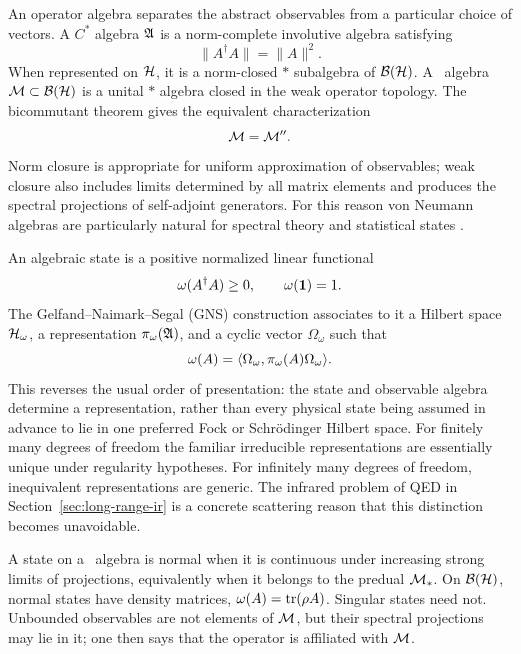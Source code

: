 An operator algebra separates the abstract observables from a particular
choice of vectors.  A $C^*$ algebra $\mathfrak{A}$ is a norm-complete involutive
algebra satisfying
\begin{equation}
  \|A^\dagger A\|=\|A\|^2 .
  \label{eq:cstar-identity}
\end{equation}
When represented on $\mathcal{H}$, it is a norm-closed $*$ subalgebra of
$\mathcal{B}(\mathcal{H})$.  A \vN\ algebra $\mathcal{M}\subset\mathcal{B}(\mathcal{H})$ is a unital
$*$ algebra closed in the weak operator topology.  The bicommutant theorem
gives the equivalent characterization
\begin{equation}
  \mathcal{M}=\mathcal{M}'' .
  \label{eq:bicommutant-theorem}
\end{equation}
Norm closure is appropriate for uniform approximation of observables; weak
closure also includes limits determined by all matrix elements and produces
the spectral projections of self-adjoint generators.  For this reason von
Neumann algebras are particularly natural for spectral theory and statistical
states \cite{Takesaki:2002,BratteliRobinsonI:1987}.

An algebraic state is a positive normalized linear functional
\begin{equation}
  \omega(A^\dagger A)\geq0,
  \qquad
  \omega(\mathbf{1})=1 .
  \label{eq:algebraic-state}
\end{equation}
The Gelfand--Naimark--Segal (GNS) construction associates to it a Hilbert space
$\mathcal{H}_\omega$, a representation $\pi_\omega(\mathfrak{A})$, and a cyclic
vector $\Omega_\omega$ such that
\begin{equation}
  \omega(A)
  =\langle \Omega_\omega,\pi_\omega(A)\Omega_\omega\rangle .
  \label{eq:GNS-state}
\end{equation}
This reverses the usual order of presentation: the state and observable
algebra determine a representation, rather than every physical state being
assumed in advance to lie in one preferred Fock or Schr\"odinger Hilbert space.
For finitely many degrees of freedom the familiar irreducible representations
are essentially unique under regularity hypotheses.  For infinitely many
degrees of freedom, inequivalent representations are generic.  The infrared
problem of QED in Section~\ref{sec:long-range-ir} is a concrete scattering
reason that this distinction becomes unavoidable.

A state on a \vN\ algebra is normal when it is continuous under
increasing strong limits of projections, equivalently when it belongs to the
predual $\mathcal{M}_*$.  On $\mathcal{B}(\mathcal{H})$, normal states have density matrices,
$\omega(A)=\operatorname{tr}(\rho A)$.  Singular states need not.  Unbounded observables
are not elements of $\mathcal{M}$, but their spectral projections may lie in it;
one then says that the operator is affiliated with $\mathcal{M}$.

